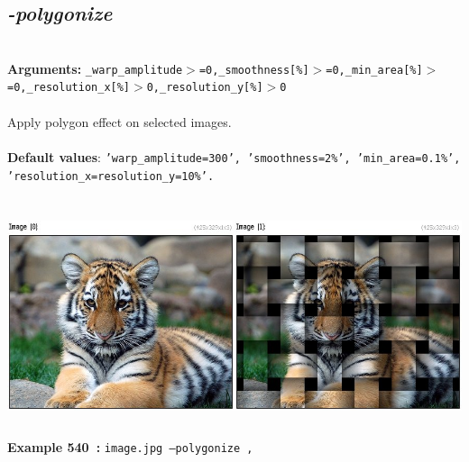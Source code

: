 \documentclass[a4paper,11pt,twoside]{book}
\begin{document}
\subsection{\emph{-polygonize} }\vspace*{-0.5em}
~\\\textbf{Arguments: } 
{\small \texttt{\_warp\_amplitude$>$=0,\_smoothness[\%]$>$=0,\_min\_area[\%]$>$=0,\_resolution\_x[\%]$>$0,\_resolution\_y[\%]$>$0}}\\~\\
Apply polygon effect on selected images.
~\\~\\\textbf{Default values}: {\small \texttt{'warp\_amplitude=300', 'smoothness=2\%', 'min\_area=0.1\%', 'resolution\_x=resolution\_y=10\%'.}}
\begin{center}\includegraphics[keepaspectratio=true,height=7cm,width=\textwidth]{img/gmic_def540.jpg}\\
{\footnotesize \textbf{Example 540~:} \texttt{image.jpg --polygonize ,}}
\end{center}
\end{document}
